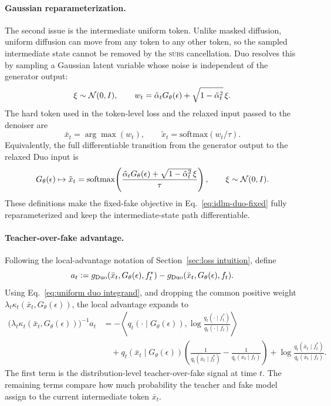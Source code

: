 \begin{reviewblock}
\paragraph{Gaussian reparameterization.}
The second issue is the intermediate uniform token. Unlike masked diffusion,
uniform diffusion can move from any token to any other token, so the sampled
intermediate state cannot be removed by the \textsc{subs} cancellation. Duo
resolves this by sampling a Gaussian latent variable whose noise is independent
of the generator output:
\[
    \xi\sim\mathcal{N}(0,I),
    \qquad
    w_t=\tilde{\alpha}_tG_\theta(\epsilon)
    +\sqrt{1-\tilde{\alpha}_t^2}\,\xi .
\]
The hard token used in the token-level loss and the relaxed input passed to
the denoiser are
\[
    \bar{x}_t=\arg\max(w_t),
    \qquad
    \tilde{x}_t=\mathrm{softmax}(w_t/\tau).
\]
Equivalently, the full differentiable transition from the generator output to
the relaxed Duo input is
\[
    G_\theta(\epsilon)
    \mapsto
    \tilde{x}_t
    =
    \mathrm{softmax}\!\left(
    \frac{\tilde{\alpha}_tG_\theta(\epsilon)
    +\sqrt{1-\tilde{\alpha}_t^2}\,\xi}{\tau}
    \right),
    \qquad
    \xi\sim\mathcal{N}(0,I).
\]
These definitions make the fixed-fake objective in Eq.~\eqref{eq:idlm-duo-fixed}
fully reparameterized and keep the intermediate-state path differentiable.

\paragraph{Teacher-over-fake advantage.}
Following the local-advantage notation of Section~\ref{sec:loss intuition}, define
\[
a_t \vcentcolon= g_{\mathrm{Duo}}(\bar{x}_t,G_\theta(\epsilon),f_t^*) - g_{\mathrm{Duo}}(\bar{x}_t,G_\theta(\epsilon),f_t).
\]
Using Eq.~\eqref{eq:uniform duo integrand}, and dropping the common positive
weight $\lambda_t\kappa_t(\bar{x}_t,G_\theta(\epsilon))$, the local advantage
expands to
\[
\begin{aligned}
\bigl(\lambda_t\kappa_t(\bar{x}_t,G_\theta(\epsilon))\bigr)^{-1}a_t
&=
-\left\langle q_t(\cdot\mid G_\theta(\epsilon)),\log\frac{q_t(\cdot\mid f_t^*)}{q_t(\cdot\mid f_t)}\right\rangle
\\
&\quad
+ q_t(\bar{x}_t\mid G_\theta(\epsilon))
\left(\frac{1}{q_t(\bar{x}_t\mid f_t^*)}-\frac{1}{q_t(\bar{x}_t\mid f_t)}\right)
+ \log\frac{q_t(\bar{x}_t\mid f_t^*)}{q_t(\bar{x}_t\mid f_t)}.
\end{aligned}
\]
The first term is the distribution-level teacher-over-fake signal at time $t$.
The remaining terms compare how much probability the teacher and fake model
assign to the current intermediate token $\bar{x}_t$.


\end{reviewblock}
